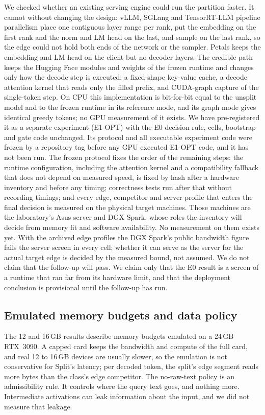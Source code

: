\documentclass[lettersize,journal]{IEEEtran}
\begin{document}
We checked whether an existing serving engine could run the partition faster. It cannot without changing the design: vLLM, SGLang and TensorRT-LLM pipeline parallelism place one contiguous layer range per rank, put the embedding on the first rank and the norm and LM head on the last, and sample on the last rank, so the edge could not hold both ends of the network or the sampler. Petals keeps the embedding and LM head on the client but no decoder layers. The credible path keeps the Hugging Face modules and weights of the frozen runtime and changes only how the decode step is executed: a fixed-shape key-value cache, a decode attention kernel that reads only the filled prefix, and CUDA-graph capture of the single-token step. On CPU this implementation is bit-for-bit equal to the unsplit model and to the frozen runtime in its reference mode, and its graph mode gives identical greedy tokens; no GPU measurement of it exists. We have pre-registered it as a separate experiment (E1-OPT) with the E0 decision rule, cells, bootstrap and gate code unchanged. Its protocol and all executable experiment code were frozen by a repository tag before any GPU executed E1-OPT code, and it has not been run. The frozen protocol fixes the order of the remaining steps: the runtime configuration, including the attention kernel and a compatibility fallback that does not depend on measured speed, is fixed by hash after a hardware inventory and before any timing; correctness tests run after that without recording timings; and every edge, competitor and server profile that enters the final decision is measured on the physical target machines. Those machines are the laboratory's Asus server and DGX Spark, whose roles the inventory will decide from memory fit and software availability. No measurement on them exists yet. With the archived edge profiles the DGX Spark's public bandwidth figure fails the server screen in every cell; whether it can serve as the server for the actual target edge is decided by the measured bound, not assumed. We do not claim that the follow-up will pass. We claim only that the E0 result is a screen of a runtime that ran far from its hardware limit, and that the deployment conclusion is provisional until the follow-up has run.

\subsection{Emulated memory budgets and data policy}
The 12 and 16\,GB results describe memory budgets emulated on a 24\,GB RTX~3090. A capped card keeps the bandwidth and compute of the full card, and real 12 to 16\,GB devices are usually slower, so the emulation is not conservative for Split's latency; per decoded token, the split's edge segment reads more bytes than the class's edge competitor. The no-raw-text policy is an admissibility rule. It controls where the query text goes, and nothing more. Intermediate activations can leak information about the input, and we did not measure that leakage.
\end{document}
